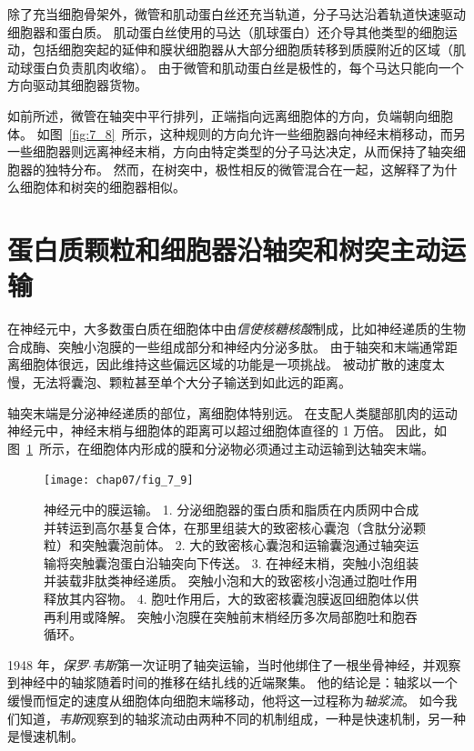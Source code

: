 除了充当细胞骨架外，微管和肌动蛋白丝还充当轨道，分子马达沿着轨道快速驱动细胞器和蛋白质。
肌动蛋白丝使用的马达（肌球蛋白）还介导其他类型的细胞运动，包括细胞突起的延伸和膜状细胞器从大部分细胞质转移到质膜附近的区域（肌动球蛋白负责肌肉收缩）。
由于微管和肌动蛋白丝是极性的，每个马达只能向一个方向驱动其细胞器货物。


如前所述，微管在轴突中平行排列，正端指向远离细胞体的方向，负端朝向细胞体。
如图~\ref{fig:7_8}~所示，这种规则的方向允许一些细胞器向神经末梢移动，而另一些细胞器则远离神经末梢，方向由特定类型的分子马达决定，从而保持了轴突细胞器的独特分布。
然而，在树突中，极性相反的微管混合在一起，这解释了为什么细胞体和树突的细胞器相似。




\section{蛋白质颗粒和细胞器沿轴突和树突主动运输}

在神经元中，大多数蛋白质在细胞体中由\textit{信使核糖核酸}制成，比如神经递质的生物合成酶、突触小泡膜的一些组成部分和神经内分泌多肽。
由于轴突和末端通常距离细胞体很远，因此维持这些偏远区域的功能是一项挑战。
被动扩散的速度太慢，无法将囊泡、颗粒甚至单个大分子输送到如此远的距离。


轴突末端是分泌神经递质的部位，离细胞体特别远。
在支配人类腿部肌肉的运动神经元中，神经末梢与细胞体的距离可以超过细胞体直径的 1 万倍。
因此，如图~\ref{fig:7_9}~所示，在细胞体内形成的膜和分泌物必须通过主动运输到达轴突末端。


\begin{figure}[htbp]
	\centering
	\texttt{[image: chap07/fig\_7\_9]}
	\caption{神经元中的膜运输。
		1. 分泌细胞器的蛋白质和脂质在内质网中合成并转运到高尔基复合体，在那里组装大的致密核心囊泡（含肽分泌颗粒）和突触囊泡前体。
		2. 大的致密核心囊泡和运输囊泡通过轴突运输将突触囊泡蛋白沿轴突向下传送。
		3. 在神经末梢，突触小泡组装并装载非肽类神经递质。
		突触小泡和大的致密核小泡通过胞吐作用释放其内容物。
		4. 胞吐作用后，大的致密核囊泡膜返回细胞体以供再利用或降解。
		突触小泡膜在突触前末梢经历多次局部胞吐和胞吞循环。}
	\label{fig:7_9}
\end{figure}


1948 年，\textit{保罗$\cdot$韦斯}第一次证明了轴突运输，当时他绑住了一根坐骨神经，并观察到神经中的轴浆随着时间的推移在结扎线的近端聚集。
他的结论是：轴浆以一个缓慢而恒定的速度从细胞体向细胞末端移动，他将这一过程称为\textit{轴浆流}。
如今我们知道，\textit{韦斯}观察到的轴浆流动由两种不同的机制组成，一种是快速机制，另一种是慢速机制。


